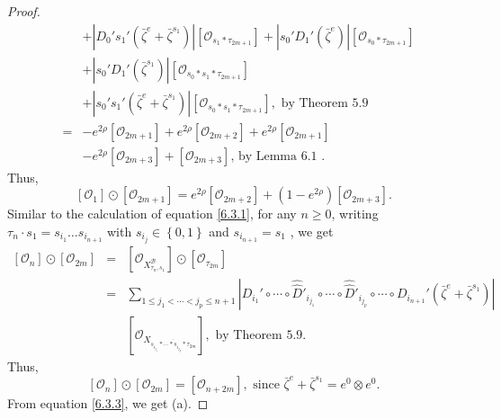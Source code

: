 \documentclass[10pt,a4paper]{amsart}
\def\B{\mathcal{B}}
\def\ref#1{#1}
\begin{document}
\begin{proof}
\begin{eqnarray*}
&&+ \left\vert D_0's_1' \left(\bar{\zeta}^e+\bar{\zeta}^{s_1}\right) \right\vert \left[\mathcal{O}_{s_1*\tau_{2m+1}}\right]+\left\vert s_0'D_1'(\bar{\zeta}^e)\right\vert \left[\mathcal{O}_{s_0*\tau_{2m+1}}\right]\\
&&+ \left\vert s_0'D_1' (\bar{\zeta}^{s_1}) \right\vert \left[\mathcal{O}_{s_0*s_1*\tau_{2m+1}}\right]\\
&&+\left\vert s_0's_1'\left(\bar{\zeta}^e+\bar{\zeta}^{s_1}\right) \right\vert \left[\mathcal{O}_{s_0*s_1*\tau_{2m+1}}\right],\mbox{ by Theorem \ref{5.9}}\\
&=& -e^{2\rho} \left[\mathcal{O}_{2m+1}\right] +e^{2\rho} \left[\mathcal{O}_{2m+2}\right] + e^{2\rho} \left[\mathcal{O}_{2m+1}\right] \\
&&- e^{2\rho} \left[\mathcal{O}_{2m+3}\right] +\left[\mathcal{O}_{2m+3}\right] \mbox{, by Lemma \ref{6.1} }.
\end{eqnarray*}
Thus, 
\begin{equation}\label{6.3.2}
\left[ \mathcal{O}_{1}\right] \odot \left[ \mathcal{O}_{2m+1}\right] = e^{2\rho} \left[\mathcal{O}_{2m+2}\right] +\left(1-e^{2\rho} \right)\left[\mathcal{O}_{2m+3}\right].
\end{equation}
Similar to the calculation of equation \eqref{6.3.1}, for any $n\geq 0$, writing $\tau_n\cdot s_1=s_{i_1}\ldots s_{i_{n+1}}$ with $s_{i_j}\in \left\{ 0,1\right\}$ and $s_{i_{n+1}}=s_1$ , we get
\begin{eqnarray*}
\left[ \mathcal{O}_{n}\right] \odot \left[ \mathcal{O}_{2m}\right]  &=& \left[ \mathcal{O}_{X_{\tau_n,s_1}^\B}\right] \odot \left[\mathcal{O}_{\tau_{2m}}\right]\\
&=& \sum_{1\leq j_1 <\cdots < j_p \leq n+1}\left\vert D_{i_1}' \circ \cdots \circ \hat{\hat{D}}'_{i_{j_1}}\circ \cdots \circ \hat{\hat{D}}'_{i_{j_p}}\circ \cdots \circ D_{i_{n+1}}'\left(\bar{\zeta}^e+\bar{\zeta}^{s_1}\right) \right\vert \\
&&[ \mathcal{O}_{X_{\overline{s_{i_{j_1}}*\cdots * s_{i_{j_p}}*\tau_{2m}}}}],\mbox{ by Theorem \ref{5.9}} .
\end{eqnarray*}
Thus,
\begin{equation}\label{6.3.3}
\left[ \mathcal{O}_{n}\right] \odot \left[ \mathcal{O}_{2m}\right] =  \left[ \mathcal{O}_{n+2m}\right] ,\mbox{ since } \bar{\zeta}^e+\bar{\zeta}^{s_1} = e^0 \otimes e^0.
\end{equation}
From equation \eqref{6.3.3}, we get (a). 


\end{proof}
\end{document}
